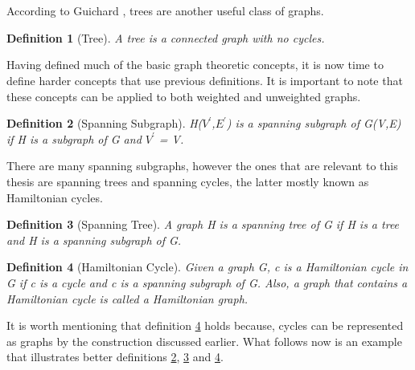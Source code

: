\documentclass{article}
\newtheorem{definition}{Definition}[subsection]
\begin{document}
\\
\\
According to Guichard \cite{guichard_2018}, trees are another useful class of graphs.
\begin{definition}[Tree]
\label{tree}
A tree is a connected graph with no cycles. 
\end{definition}
Having defined much of the basic graph theoretic concepts, it is now time to define harder concepts that use previous definitions. It is important to note that these concepts can be applied to both weighted and unweighted graphs.
\begin{definition}[Spanning Subgraph]
\label{spanning subgraph}
H($V^\prime$,$E^\prime$) is a spanning subgraph of G(V,E) if H is a subgraph of G and $V^\prime$ = V. 
\end{definition}
There are many spanning subgraphs, however the ones that are relevant to this thesis are spanning trees and spanning cycles, the latter mostly known as Hamiltonian cycles.
\begin{definition}[Spanning Tree]
A graph H is a spanning tree of G if H is a tree and H is a spanning subgraph of G. 
\label{spanning tree}
\end{definition}
\begin{definition}[Hamiltonian Cycle]
\label{hamiltonian cycle}
Given a graph G, c is a Hamiltonian cycle in G if c is a cycle and c is a spanning subgraph of G. Also, a graph that contains a Hamiltonian cycle is called a Hamiltonian graph. 
\end{definition}
It is worth mentioning that definition \ref{hamiltonian cycle} holds because, cycles can be represented as graphs by the construction discussed earlier. What follows now is an example that illustrates better definitions \ref{spanning subgraph}, \ref{spanning tree} and \ref{hamiltonian cycle}. 
\newpage
\end{document}
